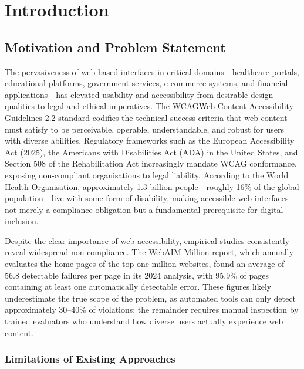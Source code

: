 \chapter{Introduction}
\label{ch:introduction}

\section{Motivation and Problem Statement}
\label{sec:motivation}

The pervasiveness of web-based interfaces in critical domains---healthcare portals, educational platforms, government services, e-commerce systems, and financial applications---has elevated usability and accessibility from desirable design qualities to legal and ethical imperatives. The \acrfull{WCAG}{Web Content Accessibility Guidelines} 2.2 standard codifies the technical success criteria that web content must satisfy to be perceivable, operable, understandable, and robust for users with diverse abilities. Regulatory frameworks such as the European Accessibility Act (2025), the Americans with Disabilities Act (ADA) in the United States, and Section 508 of the Rehabilitation Act increasingly mandate WCAG conformance, exposing non-compliant organisations to legal liability. According to the World Health Organisation, approximately 1.3 billion people---roughly 16\% of the global population---live with some form of disability, making accessible web interfaces not merely a compliance obligation but a fundamental prerequisite for digital inclusion.

Despite the clear importance of web accessibility, empirical studies consistently reveal widespread non-compliance. The WebAIM Million report, which annually evaluates the home pages of the top one million websites, found an average of 56.8 detectable  failures per page in its 2024 analysis, with 95.9\% of pages containing at least one automatically detectable error. These figures likely underestimate the true scope of the problem, as automated tools can only detect approximately 30--40\% of  violations; the remainder requires manual inspection by trained evaluators who understand how diverse users actually experience web content.

\subsection{Limitations of Existing Approaches}

